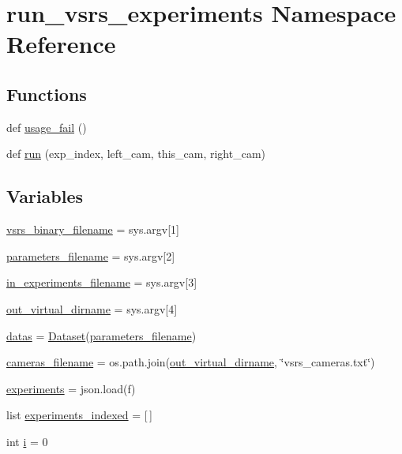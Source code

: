 \hypertarget{namespacerun__vsrs__experiments}{}\section{run\+\_\+vsrs\+\_\+experiments Namespace Reference}
\label{namespacerun__vsrs__experiments}
\subsection*{Functions}
\begin{DoxyCompactItemize}
\item 
def \hyperlink{namespacerun__vsrs__experiments_a059f24f18fd95eb85872cdcf43c6667c}{usage\+\_\+fail} ()
\item 
def \hyperlink{namespacerun__vsrs__experiments_adf0062078b9b0fe8148b28f1ac2bf06f}{run} (exp\+\_\+index, left\+\_\+cam, this\+\_\+cam, right\+\_\+cam)
\end{DoxyCompactItemize}
\subsection*{Variables}
\begin{DoxyCompactItemize}
\item 
\hyperlink{namespacerun__vsrs__experiments_a2ccbb110feafbaec437f5ff9aad76bc5}{vsrs\+\_\+binary\+\_\+filename} = sys.\+argv\mbox{[}1\mbox{]}
\item 
\hyperlink{namespacerun__vsrs__experiments_ab796f5c8f678b861ed3f34beb71e181b}{parameters\+\_\+filename} = sys.\+argv\mbox{[}2\mbox{]}
\item 
\hyperlink{namespacerun__vsrs__experiments_ad6902d87996045a9e7e607a7045f3901}{in\+\_\+experiments\+\_\+filename} = sys.\+argv\mbox{[}3\mbox{]}
\item 
\hyperlink{namespacerun__vsrs__experiments_ae05c0e64146770296e94c641b040b5c6}{out\+\_\+virtual\+\_\+dirname} = sys.\+argv\mbox{[}4\mbox{]}
\item 
\hyperlink{namespacerun__vsrs__experiments_aacf2ecb4f74a741c31ee436ca7018d07}{datas} = \hyperlink{classpylib_1_1dataset_1_1Dataset}{Dataset}(\hyperlink{namespacerun__vsrs__experiments_ab796f5c8f678b861ed3f34beb71e181b}{parameters\+\_\+filename})
\item 
\hyperlink{namespacerun__vsrs__experiments_ab3219370020230066ea966510359fbc1}{cameras\+\_\+filename} = os.\+path.\+join(\hyperlink{namespacerun__vsrs__experiments_ae05c0e64146770296e94c641b040b5c6}{out\+\_\+virtual\+\_\+dirname}, \char`\"{}vsrs\+\_\+cameras.\+txt\char`\"{})
\item 
\hyperlink{namespacerun__vsrs__experiments_a77b5d05bfd21ce9b4ff6b6e6545587d0}{experiments} = json.\+load(f)
\item 
list \hyperlink{namespacerun__vsrs__experiments_abec2d7761f5ef2f337a46cbc4a8977b7}{experiments\+\_\+indexed} = \mbox{[}$\,$\mbox{]}
\item 
int \hyperlink{namespacerun__vsrs__experiments_a45f41fbaac363730cac7f912b2382e2b}{i} = 0
\end{DoxyCompactItemize}


